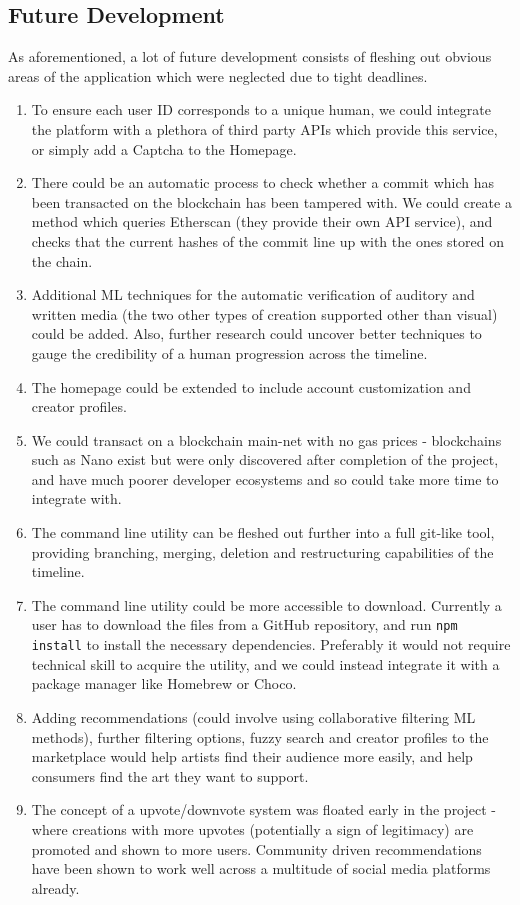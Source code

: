 \documentclass[12pt,a4paper]{article}
\begin{document}
\subsection{Future Development}
As aforementioned, a lot of future development consists of fleshing out obvious areas of the application which were neglected due to tight deadlines.
\begin{enumerate}
    \item To ensure each user ID corresponds to a unique human, we could integrate the platform with a plethora of third party APIs which provide this service, or simply add a Captcha to the Homepage.
    \item There could be an automatic process to check whether a commit which has been transacted on the blockchain has been tampered with. We could create a method which queries Etherscan (they provide their own API service), and checks that the current hashes of the commit line up with the ones stored on the chain.
    \item Additional ML techniques for the automatic verification of auditory and written media (the two other types of creation supported other than visual) could be added. Also, further research could uncover better techniques to gauge the credibility of a human progression across the timeline.
    \item The homepage could be extended to include account customization and creator profiles.
    \item We could transact on a blockchain main-net with no gas prices - blockchains such as Nano \cite{nano} exist but were only discovered after completion of the project, and have much poorer developer ecosystems and so could take more time to integrate with.
    \item The command line utility can be fleshed out further into a full git-like tool, providing branching, merging, deletion and restructuring capabilities of the timeline.
    \item The command line utility could be more accessible to download. Currently a user has to download the files from a GitHub repository, and run \verb|npm install| to install the necessary dependencies. Preferably it would not require technical skill to acquire the utility, and we could instead integrate it with a package manager like Homebrew or Choco.
    \item Adding recommendations (could involve using collaborative filtering ML methods), further filtering options, fuzzy search and creator profiles to the marketplace would help artists find their audience more easily, and help consumers find the art they want to support.  
    \item The concept of a upvote/downvote system was floated early in the project - where creations with more upvotes (potentially a sign of legitimacy) are promoted and shown to more users. Community driven recommendations have been shown to work well across a multitude of social media platforms already.
\end{enumerate}
\end{document}
